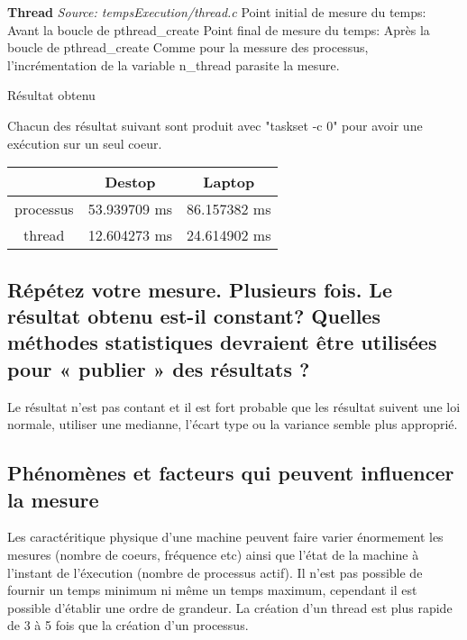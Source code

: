 \documentclass[12pt]{article}
\begin{document}
		\textbf{Thread}\newline
		\textit{Source: tempsExecution/thread.c}\newline
		Point initial de mesure du temps: Avant la boucle de pthread\_create\newline
		Point final de mesure du temps: Après la boucle de pthread\_create\newline
		\newline
		Comme pour la messure des processus, l'incrémentation de la variable
		n\_thread parasite la mesure.\newline

		Résultat obtenu

		Chacun des résultat suivant sont produit avec "taskset -c 0" pour avoir
		une exécution sur un seul coeur.

		\begin{center}
		  \begin{tabular}{ | c | c | c | }
				\hline
					&	Destop      &    Laptop \\
				\hline
					processus & 53.939709 ms  &     86.157382 ms \\
				\hline
					thread    & 12.604273 ms  &      24.614902 ms \\
				\hline
			\end{tabular}
		\end{center}

	\subsection{Répétez votre mesure. Plusieurs fois. Le résultat obtenu est-il constant? Quelles méthodes statistiques devraient être utilisées pour « publier » des résultats ?}

		Le résultat n'est pas contant et il est fort probable que les résultat suivent
		une loi normale, utiliser une medianne, l'écart type ou la variance semble plus approprié.
		\newline

	\subsection{Phénomènes et facteurs qui peuvent influencer la mesure}

		Les caractéritique physique d'une machine peuvent faire varier énormement les
		mesures (nombre de coeurs, fréquence etc) ainsi que l'état de la machine à
		l'instant de l'éxecution (nombre de processus actif).
		Il n'est pas possible de fournir un temps minimum ni même un temps maximum,
		cependant il est possible d'établir une ordre de grandeur.
		La création d'un thread est plus rapide de 3 à 5 fois que la création d'un
		processus.\newline
\end{document}

